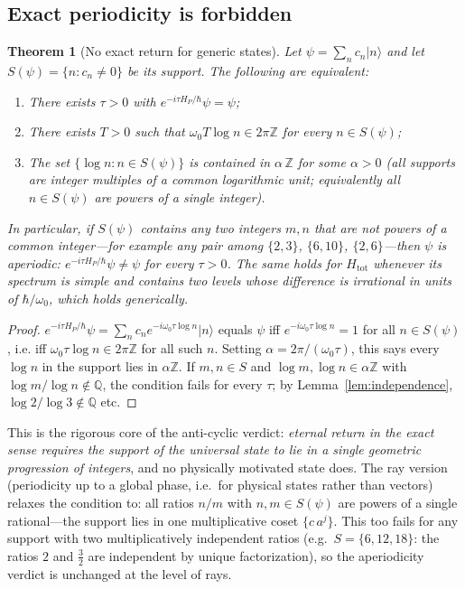 \documentclass[11pt,a4paper]{article}
\theoremstyle{plain}
\newtheorem{theorem}{Theorem}[section]
\theoremstyle{definition}
\theoremstyle{remark}
\newcommand{\ket}[1]{\lvert #1\rangle}
\newcommand{\Zz}{\mathbb{Z}}
\newcommand{\Qq}{\mathbb{Q}}
\begin{document}
\subsection{Exact periodicity is forbidden}

\begin{theorem}[No exact return for generic states]\label{thm:noperiod}
Let $\psi=\sum_{n}c_{n}\ket{n}$ and let $S(\psi)=\{n:c_{n}\neq0\}$ be its support. The
following are equivalent:
\begin{enumerate}[leftmargin=1.6em]
\item There exists $\tau>0$ with $e^{-i\tau H_{P}/\hbar}\psi=\psi$;
\item There exists $T>0$ such that $\omega_{0}T\log n\in2\pi\Zz$ for every $n\in S(\psi)$;
\item The set $\{\log n:n\in S(\psi)\}$ is contained in $\alpha\,\Zz$ for some $\alpha>0$
(all supports are integer multiples of a common logarithmic unit; equivalently all $n\in
S(\psi)$ are powers of a single integer).
\end{enumerate}
In particular, if $S(\psi)$ contains any two integers $m,n$ that are not powers of a common
integer---for example any pair among $\{2,3\}$, $\{6,10\}$, $\{2,6\}$---then $\psi$ is
aperiodic: $e^{-i\tau H_{P}/\hbar}\psi\neq\psi$ for every $\tau>0$. The same holds for
$H_{\mathrm{tot}}$ whenever its spectrum is simple and contains two levels whose difference is
irrational in units of $\hbar/\omega_{0}$, which holds generically.
\end{theorem}

\begin{proof}
$e^{-i\tau H_{P}/\hbar}\psi=\sum_{n}c_{n}e^{-i\omega_{0}\tau\log n}\ket{n}$ equals $\psi$ iff
$e^{-i\omega_{0}\tau\log n}=1$ for all $n\in S(\psi)$, i.e. iff
$\omega_{0}\tau\log n\in2\pi\Zz$ for all such $n$. Setting $\alpha=2\pi/(\omega_{0}\tau)$,
this says every $\log n$ in the support lies in $\alpha\Zz$. If $m,n\in S$ and
$\log m,\log n\in\alpha\Zz$ with $\log m/\log n\notin\Qq$, the condition fails for every
$\tau$; by Lemma~\ref{lem:independence}, $\log 2/\log 3\notin\Qq$ etc.
\end{proof}

This is the rigorous core of the anti-cyclic verdict: \emph{eternal return in the exact sense
requires the support of the universal state to lie in a single geometric progression of
integers}, and no physically motivated state does. The ray version (periodicity up to a global
phase, i.e.\ for physical states rather than vectors) relaxes the condition to: all ratios
$n/m$ with $n,m\in S(\psi)$ are powers of a single rational---the support lies in one
multiplicative coset $\{c\,a^{j}\}$. This too fails for any support with two
multiplicatively independent ratios (e.g.\ $S=\{6,12,18\}$: the ratios $2$ and $\tfrac32$
are independent by unique factorization), so the aperiodicity verdict is unchanged at the
level of rays.
\end{document}
